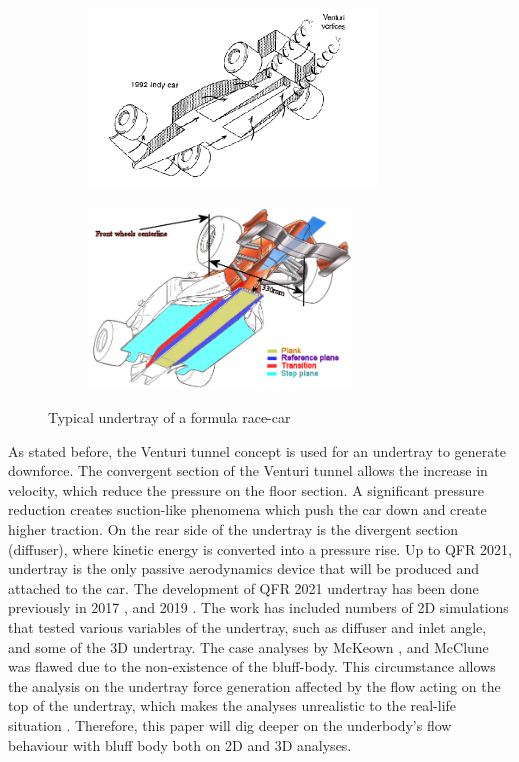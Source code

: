 \begin{figure}[!ht]
\begin{center}
%    
  \begin{subfigure}[b]{0.4\textwidth}
    \includegraphics[height=4.8cm]{Figures/underbody.PNG}
  \end{subfigure}
  \begin{subfigure}[b]{0.4\textwidth}
    \includegraphics[height=4.8cm]{Figures/undertray_f1.png}
  \end{subfigure}
%  
  \caption{Typical undertray of a formula race-car \cite{Katz1995RaceSpeed}\cite{AnonymousUndertrayUnderbody}}
    \label{fig:underbody}
\end{center}
\end{figure}

\noindent As stated before, the Venturi tunnel concept is used for an undertray to generate downforce. The convergent section of the Venturi tunnel allows the increase in velocity, which reduce the pressure on the floor section. A significant pressure reduction creates suction-like phenomena which push the car down and create higher traction. On the rear side of the undertray is the divergent section (diffuser), where kinetic energy is converted into a pressure rise. 
\noindent Up to QFR 2021, undertray is the only passive aerodynamics device that will be produced and attached to the car. The development of QFR 2021 undertray has been done previously in 2017 \cite{McKeown2018DesignCar}, and 2019 \cite{McClune2018DesignCar}. The work has included numbers of 2D simulations that tested various variables of the undertray, such as diffuser and inlet angle, and some of the 3D undertray. The case analyses by McKeown \cite{McKeown2018DesignCar}, and McClune \cite{McClune2018DesignCar} was flawed due to the non-existence of the bluff-body. This circumstance allows the analysis on the undertray force generation affected by the flow acting on the top of the undertray, which makes the analyses unrealistic to the real-life situation \cite{Corr2017MechanicalAuthor}. Therefore, this paper will dig deeper on the underbody's flow behaviour with bluff body both on 2D and 3D analyses. 

